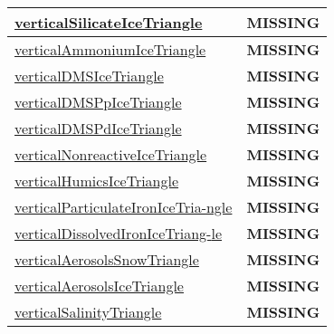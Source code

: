 {\begin{center}
\begin{longtable}{| p{2.0in} | p{4.0in} |}
    \hline
    \hyperref[subsec:var_sec_tracer_triangles_verticalSilicateIceTriangle]{verticalSilicateIceTriangle} & {\bf \color{red} MISSING} \\
    \hline
    \hyperref[subsec:var_sec_tracer_triangles_verticalAmmoniumIceTriangle]{verticalAmmoniumIceTriangle} & {\bf \color{red} MISSING} \\
    \hline
    \hyperref[subsec:var_sec_tracer_triangles_verticalDMSIceTriangle]{verticalDMSIceTriangle} & {\bf \color{red} MISSING} \\
    \hline
    \hyperref[subsec:var_sec_tracer_triangles_verticalDMSPpIceTriangle]{verticalDMSPpIceTriangle} & {\bf \color{red} MISSING} \\
    \hline
    \hyperref[subsec:var_sec_tracer_triangles_verticalDMSPdIceTriangle]{verticalDMSPdIceTriangle} & {\bf \color{red} MISSING} \\
    \hline
    \hyperref[subsec:var_sec_tracer_triangles_verticalNonreactiveIceTriangle]{verticalNonreactiveIceTriangle} & {\bf \color{red} MISSING} \\
    \hline
    \hyperref[subsec:var_sec_tracer_triangles_verticalHumicsIceTriangle]{verticalHumicsIceTriangle} & {\bf \color{red} MISSING} \\
    \hline
    \hyperref[subsec:var_sec_tracer_triangles_verticalParticulateIronIceTriangle]{verticalParticulateIronIceTria-}\hyperref[subsec:var_sec_tracer_triangles_verticalParticulateIronIceTriangle]{ngle  }& {\bf \color{red} MISSING} \\
    \hline
    \hyperref[subsec:var_sec_tracer_triangles_verticalDissolvedIronIceTriangle]{verticalDissolvedIronIceTriang-}\hyperref[subsec:var_sec_tracer_triangles_verticalDissolvedIronIceTriangle]{le  }& {\bf \color{red} MISSING} \\
    \hline
    \hyperref[subsec:var_sec_tracer_triangles_verticalAerosolsSnowTriangle]{verticalAerosolsSnowTriangle} & {\bf \color{red} MISSING} \\
    \hline
    \hyperref[subsec:var_sec_tracer_triangles_verticalAerosolsIceTriangle]{verticalAerosolsIceTriangle} & {\bf \color{red} MISSING} \\
    \hline
    \hyperref[subsec:var_sec_tracer_triangles_verticalSalinityTriangle]{verticalSalinityTriangle} & {\bf \color{red} MISSING} \\
    \hline
\end{longtable}
\end{center}
}
